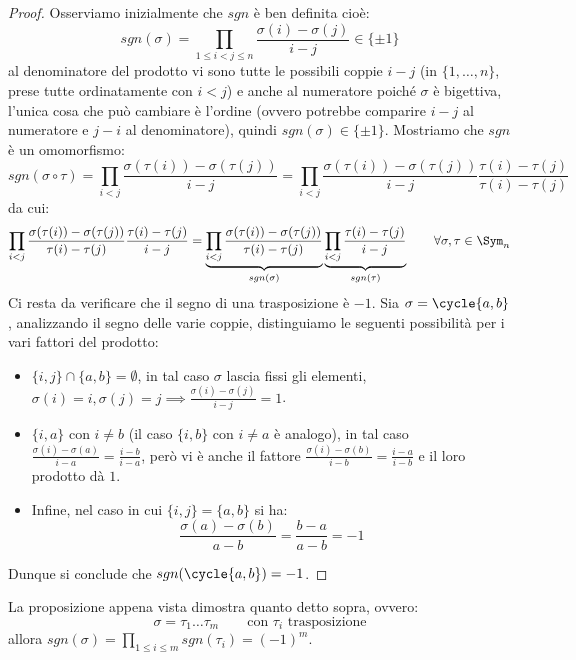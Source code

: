 \documentclass[11pt]{scrartcl}
\begin{document}
\begin{proof}
    Osserviamo inizialmente che $sgn$ è ben definita cioè:
        \[ sgn(\sigma) = \prod_{1 \leq i < j \leq n} \frac{\sigma(i) - \sigma(j)}{i - j} \in \{\pm 1\}
            \]
    al denominatore del prodotto vi sono tutte le possibili coppie $i - j$ (in $\{1,\ldots,n\}$, prese tutte ordinatamente con $i<j$) e anche al numeratore poiché $\sigma$ è bigettiva, l'unica cosa che 
    può cambiare è l'ordine (ovvero potrebbe comparire $i - j$ al numeratore e $j - i$ al denominatore), quindi $sgn(\sigma) \in \{\pm 1\}$. Mostriamo che $sgn$ 
    è un omomorfismo:
        \[ sgn(\sigma \circ \tau) = \prod_{i < j}\frac{\sigma(\tau(i)) - \sigma(\tau(j))}{i - j} =  \prod_{i < j}\frac{\sigma(\tau(i)) - \sigma(\tau(j))}{i - j}\frac{\tau(i) - \tau(j)}{\tau(i) - \tau(j)}
            \]
    da cui:
        \[ \prod_{i < j}\frac{\sigma(\tau(i)) - \sigma(\tau(j))}{\tau(i) - \tau(j)}\frac{\tau(i) - \tau(j)}{ i - j} =
        \underbrace{\prod_{i < j} \frac{\sigma(\tau(i)) - \sigma(\tau(j))}{\tau(i) - \tau(j)}}_{sgn(\sigma)} \underbrace{\prod_{i < j}\frac{\tau(i) - \tau(j)}{ i - j}}_{sgn(\tau)}
        \qquad \forall \sigma,\tau \in \Sym_n
            \]
    Ci resta da verificare che il segno di una trasposizione è $-1$. Sia $\sigma = \cycle{a,b}$, analizzando il segno delle varie coppie, distinguiamo le seguenti possibilità per i vari fattori del prodotto:
    \begin{itemize}
        \item $\{i,j\} \cap \{a,b\} = \emptyset $, in tal caso $\sigma$ lascia fissi gli elementi, $\sigma(i) = i, \sigma(j) = j \implies \frac{\sigma(i) - \sigma(j)}{i - j} = 1$.
        \item $\{i,a\}$ con $i \ne b$ (il caso $\{i,b\}$ con $i \ne a$ è analogo), in tal caso $\frac{\sigma(i) - \sigma(a)}{i - a} = \frac{i - b}{i - a}$, però vi è anche il fattore $\frac{\sigma(i) - \sigma(b)}{i - b} = \frac{i - a}{i - b}$ e 
            il loro prodotto dà $1$.
        \item Infine, nel caso in cui $\{i,j\} = \{a,b\}$ si ha:
            \[ \frac{\sigma(a) - \sigma(b)}{a - b} = \frac{b - a}{a - b} = -1
                \]
    \end{itemize}
    Dunque si conclude che $sgn(\cycle{a,b}) = -1$.
\end{proof}

\begin{remark}
    La proposizione appena vista dimostra quanto detto sopra, ovvero:
        \[ \sigma = \tau_1 \ldots \tau_m \qquad \text{con $\tau_i$ trasposizione}
            \]
    allora $sgn(\sigma) = \prod_{1\leq i \leq m}sgn(\tau_i) = (-1)^m$.
\end{remark}
\end{document}

